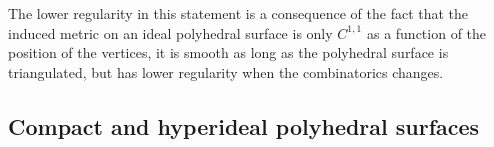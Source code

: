 \documentclass[notitlepage,twoside,a4paper]{amsart}
\newtheorem{lemma}[theorem]{\rm\bf Lemma}
\newtheorem{definition}[theorem]{\rm\bf Definition}
\theoremstyle{named}
\newcommand{\cC}{{\mathcal C}}
\newcounter{notes}%
\newcommand{\marginnote}[1]{
\refstepcounter{notes}  %
\nolinebreak
$\hspace{-5pt}{}^{\text{\tiny \rm \arabic{notes}}}$
\marginpar{\tiny \arabic{notes}) #1}
}
\begin{document}
The lower regularity in this statement is a consequence of the fact that the induced metric on an ideal polyhedral surface is only $C^{1,1}$ as a function of the position of the vertices, it is smooth as long as the polyhedral surface is triangulated, but has lower regularity when the combinatorics changes.





\subsection{Compact and hyperideal polyhedral surfaces}
\end{document}
